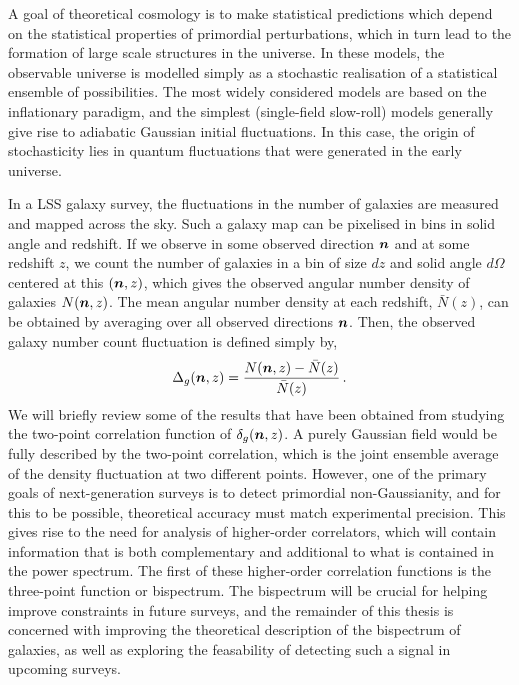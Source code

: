 A goal of theoretical cosmology is to make statistical predictions which depend on the statistical properties of primordial perturbations, which in turn lead to the formation of large scale structures in the universe. In these models, the observable universe is modelled simply as a stochastic realisation of a statistical ensemble of possibilities. The most widely considered models are based on the inflationary paradigm, and the simplest (single-field slow-roll) models generally give rise to adiabatic Gaussian initial fluctuations. In this case, the origin of stochasticity lies in quantum fluctuations that were generated in the early universe. 

In a LSS galaxy survey, the fluctuations in the number of galaxies are measured and mapped across the sky. Such a galaxy map can be pixelised in bins in solid angle and redshift. If we observe in some observed direction $\bm {n}$ and at some redshift $z$, we count the number of galaxies in a bin of size $dz$ and solid angle $d\Omega$ centered at this $(\bm {n},z)$, which gives the observed angular number density of galaxies $N(\bm {n},z)$. The mean angular number density at each redshift, $\bar{N}(z)$, can be obtained by averaging over all observed directions $\bm {n}$. 
 Then, the observed galaxy number count fluctuation is defined simply by, 
\begin{equation}
	\Delta_g(\bm {n},z) = \frac{N(\bm {n},z) - \bar{N}(z)}{\bar{N}(z)}\,.
\end{equation}
We will briefly review some of the results that have been obtained from studying the two-point correlation function of $\delta_g(\bm {n},z)$. A purely Gaussian field would be fully described by the two-point correlation, which is the joint ensemble average of the density fluctuation at two different points. However, one of the primary goals of next-generation surveys is to detect primordial non-Gaussianity, and for this to be possible, theoretical accuracy must match experimental precision. This gives rise to the need for analysis of higher-order correlators, which will contain information that is both complementary and additional to what is contained in the power spectrum. The first of these higher-order correlation functions is the three-point function or bispectrum. The bispectrum will be crucial for helping improve constraints in future surveys, and the remainder of this thesis is concerned with improving the theoretical description of the bispectrum of galaxies, as well as exploring the feasability of detecting such a signal in upcoming surveys.

